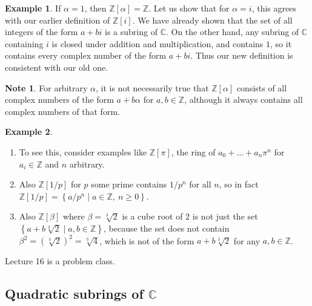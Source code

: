 \documentclass{article}
\newcommand{\Z}{\mathbb{Z}}
\newcommand{\C}{\mathbb{C}}
\newcommand{\rb}[1]{\left( #1 \right)}
\renewcommand{\sb}[1]{\left[ #1 \right]}
\newcommand{\cb}[1]{\left\{ #1 \right\}}
\theoremstyle{definition}\newtheorem{definition}{Definition}
\theoremstyle{definition}\newtheorem{remark}[definition]{Remark}
\theoremstyle{definition}\newtheorem*{example}{Example}
\theoremstyle{definition}\newtheorem*{note}{Note}
\begin{document}
\begin{example}
If $ \alpha = 1 $, then $ \Z\sb{\alpha} = \Z $. Let us show that for $ \alpha = i $, this agrees with our earlier definition of $ \Z\sb{i} $. We have already shown that the set of all integers of the form $ a + bi $ is a subring of $ \C $. On the other hand, any subring of $ \C $ containing $ i $ is closed under addition and multiplication, and contains $ 1 $, so it contains every complex number of the form $ a + bi $. Thus our new definition is consistent with our old one.
\end{example}

\begin{note}
For arbitrary $ \alpha $, it is not necessarily true that $ \Z\sb{\alpha} $ consists of all complex numbers of the form $ a + b\alpha $ for $ a, b \in \Z $, although it always contains all complex numbers of that form.
\end{note}

\begin{example}
\hfill
\begin{enumerate}
\item To see this, consider examples like $ \Z\sb{\pi} $, the ring of $ a_0 + \dots + a_n\pi^n $ for $ a_i \in \Z $ and $ n $ arbitrary.
\item Also $ \Z\sb{1 / p} $ for $ p $ some prime contains $ 1 / p^n $ for all $ n $, so in fact $ \Z\sb{1 / p} = \cb{a / p^n \mid a \in \Z, \ n \ge 0} $.
\item Also $ \Z\sb{\beta} $ where $ \beta = \sqrt[3]{2} $ is a cube root of $ 2 $ is not just the set $ \cb{a + b\sqrt[3]{2} \mid a, b \in \Z} $, because the set does not contain $ \beta^2 = \rb{\sqrt[3]{2}}^2 = \sqrt[3]{4} $, which is not of the form $ a + b\sqrt[3]{2} $ for any $ a, b \in \Z $.
\end{enumerate}
\end{example}


Lecture 16 is a problem class.


\subsection{Quadratic subrings of $ \C $}
\end{document}
